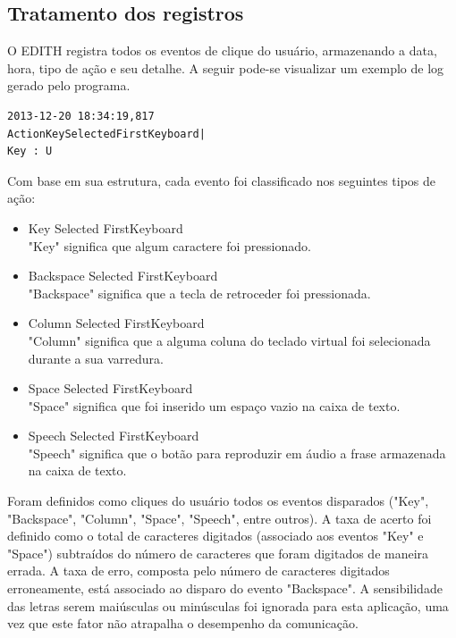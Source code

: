 \documentclass[twoside]{article}
\begin{document}
\begin{multicols}{2}
\subsection{Tratamento dos registros}

O EDITH registra todos os eventos de clique do usuário, armazenando a data, hora, tipo de ação e seu detalhe. A seguir pode-se visualizar um exemplo de log gerado pelo programa.

\begin{lstlisting}
2013-12-20 18:34:19,817 
ActionKeySelectedFirstKeyboard|
Key : U
\end{lstlisting}

Com base em sua estrutura, cada evento foi classificado nos seguintes tipos de ação:
\begin{itemize}

\item Key Selected FirstKeyboard
\hfill \\
  "Key" significa que algum caractere foi pressionado.
\item Backspace Selected FirstKeyboard
\hfill \\
  "Backspace" significa que a tecla de retroceder foi pressionada.
\item Column Selected FirstKeyboard
\hfill \\
  "Column" significa que a alguma coluna do teclado virtual foi selecionada durante a sua varredura.
\item Space Selected FirstKeyboard
\hfill \\
  "Space" significa que foi inserido um espaço vazio na caixa de texto.
\item Speech Selected FirstKeyboard
\hfill \\
  "Speech" significa que o botão para reproduzir em áudio a frase armazenada na caixa de texto.
\end{itemize}

\noindent Foram definidos como cliques do usuário todos os eventos disparados ("Key", "Backspace", "Column", "Space", "Speech", entre outros). A taxa de acerto foi definido como o total de caracteres digitados (associado aos eventos "Key" e "Space") subtraídos do número de caracteres que foram digitados de maneira errada. A taxa de erro, composta pelo número de caracteres digitados erroneamente, está associado ao disparo do evento "Backspace".
A sensibilidade das letras serem maiúsculas ou minúsculas foi ignorada para esta aplicação, uma vez que este fator não atrapalha o desempenho da comunicação.


\end{multicols}
\end{document}
